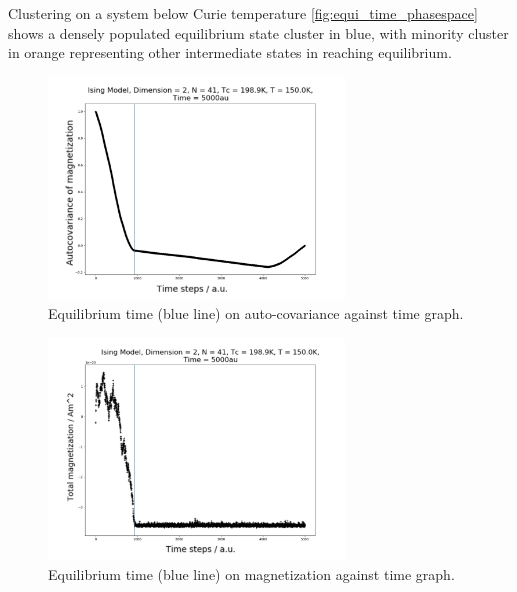 \documentclass[%
showkeys,
bibnotes,
amsmath,amssymb,
floatfix,
]{revtex4-1}
\begin{document}
Clustering on a system below Curie temperature \ref{fig:equi_time_phasespace} shows a densely populated equilibrium state cluster in blue, with minority cluster in orange representing other intermediate states in reaching equilibrium.

\begin{figure}[H] \centering
	\includegraphics[width=0.7\textwidth]{../figures/equi_time_autocovariance}
	\caption{\label{fig:equi_time_autocovariance} Equilibrium time (blue line) on auto-covariance against time graph.}
\end{figure}

\begin{figure}[H] \centering
	\includegraphics[width=0.7\textwidth]{../figures/equi_time_magnetization}
	\caption{\label{fig:equi_time_magnetization} Equilibrium time (blue line) on magnetization against time graph.}
\end{figure}
\end{document}
